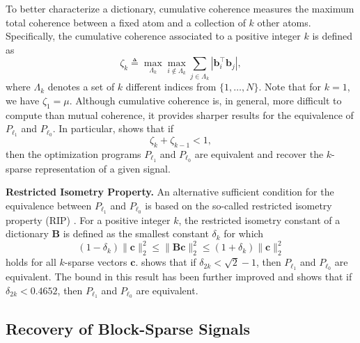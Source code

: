 \documentclass[10pt,twocolumn,twoside] {IEEEtran}
\begin{document}
To better characterize a dictionary, cumulative coherence measures the maximum total coherence between a fixed atom and a collection of $k$ other atoms. Specifically, the cumulative coherence associated to a positive integer $k$ \cite{Tropp:TIT04} is defined as 
\begin{equation}
\label{eq:cumcoh}
\zeta_k \triangleq \max_{\Lambda_k} \max_{i \notin \Lambda_k} \sum_{j \in \Lambda_k} | {\boldsymbol{b}}_i^{\top} {\boldsymbol{b}}_j |,
\end{equation}
where $\Lambda_k$ denotes a set of $k$ different indices from $\{1, \ldots, N \}$. Note that for $k=1$, we have $\zeta_1 = \mu$. 
Although cumulative coherence is, in general, more difficult to compute than mutual coherence, it provides sharper results for the equivalence of $P_{\ell_1}$ and $P_{\ell_0}$. In particular, \cite{Tropp:TIT04} shows that if 
\begin{equation}
\label{eq:cum-coh-conventional}
\zeta_k + \zeta_{k-1} < 1,
\end{equation}
then the optimization programs $P_{\ell_1}$ and $P_{\ell_0}$ are equivalent and recover the $k$-sparse representation of a given signal. 

{\medskip\noindent\textbf{{Restricted Isometry Property}.} } 
An alternative sufficient condition for the equivalence between $P_{\ell_1}$ and $P_{\ell_0}$ is based on the so-called restricted isometry property (RIP) \cite{Candes-Tao:TIT05,Candes:CRAS08}. For a positive integer $k$, the restricted isometry constant of a dictionary ${\boldsymbol{B}}$ is defined as the smallest constant $\delta_k$ for which
\begin{equation}
\label{eq:RIP}
(1 - \delta_k) \| {\boldsymbol{c}} \|_2^2 \leq \| {\boldsymbol{B}} {\boldsymbol{c}} \|_2^2 \leq (1 + \delta_k) \| {\boldsymbol{c}} \|_2^2
\end{equation}
holds for all $k$-sparse vectors ${\boldsymbol{c}}$. \cite{Candes:CRAS08} shows that if $\delta_{2k} < \sqrt{2}-1$, then $P_{\ell_1}$ and $P_{\ell_0}$ are equivalent. The bound in this result has been further improved and \cite{Foucart:ACHA10} shows that if $\delta_{2k} < 0.4652$, then $P_{\ell_1}$ and $P_{\ell_0}$ are equivalent.

\subsection{Recovery of Block-Sparse Signals}
\end{document}
